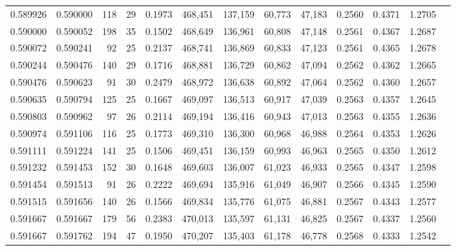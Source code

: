 \begin{tabular}{rrrrrrrrrrrrr}
0.589926 & 0.590000 &    118 &    29 &                                     0.1973 & 468,451 & 137,159 &  60,773 &  47,183 & 0.2560 & 0.4371 & 1.2705 \\
0.590000 & 0.590052 &    198 &    35 &                                     0.1502 & 468,649 & 136,961 &  60,808 &  47,148 & 0.2561 & 0.4367 & 1.2687 \\
0.590072 & 0.590241 &     92 &    25 &                                     0.2137 & 468,741 & 136,869 &  60,833 &  47,123 & 0.2561 & 0.4365 & 1.2678 \\
0.590244 & 0.590476 &    140 &    29 &                                     0.1716 & 468,881 & 136,729 &  60,862 &  47,094 & 0.2562 & 0.4362 & 1.2665 \\
0.590476 & 0.590623 &     91 &    30 &                                     0.2479 & 468,972 & 136,638 &  60,892 &  47,064 & 0.2562 & 0.4360 & 1.2657 \\
0.590635 & 0.590794 &    125 &    25 &                                     0.1667 & 469,097 & 136,513 &  60,917 &  47,039 & 0.2563 & 0.4357 & 1.2645 \\
0.590803 & 0.590962 &     97 &    26 &                                     0.2114 & 469,194 & 136,416 &  60,943 &  47,013 & 0.2563 & 0.4355 & 1.2636 \\
0.590974 & 0.591106 &    116 &    25 &                                     0.1773 & 469,310 & 136,300 &  60,968 &  46,988 & 0.2564 & 0.4353 & 1.2626 \\
0.591111 & 0.591224 &    141 &    25 &                                     0.1506 & 469,451 & 136,159 &  60,993 &  46,963 & 0.2565 & 0.4350 & 1.2612 \\
0.591232 & 0.591453 &    152 &    30 &                                     0.1648 & 469,603 & 136,007 &  61,023 &  46,933 & 0.2565 & 0.4347 & 1.2598 \\
0.591454 & 0.591513 &     91 &    26 &                                     0.2222 & 469,694 & 135,916 &  61,049 &  46,907 & 0.2566 & 0.4345 & 1.2590 \\
0.591515 & 0.591656 &    140 &    26 &                                     0.1566 & 469,834 & 135,776 &  61,075 &  46,881 & 0.2567 & 0.4343 & 1.2577 \\
0.591667 & 0.591667 &    179 &    56 &                                     0.2383 & 470,013 & 135,597 &  61,131 &  46,825 & 0.2567 & 0.4337 & 1.2560 \\
0.591667 & 0.591762 &    194 &    47 &                                     0.1950 & 470,207 & 135,403 &  61,178 &  46,778 & 0.2568 & 0.4333 & 1.2542 \\

\end{tabular}
